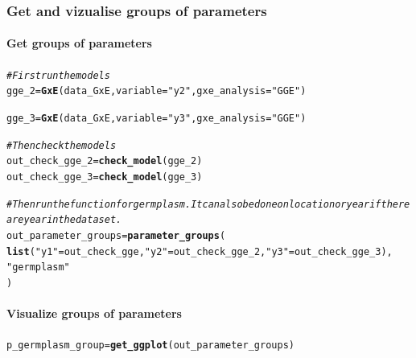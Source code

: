\documentclass{article}\usepackage[]{graphicx}\usepackage[]{color}
\makeatletter
\newcommand{\hlstr}[1]{\textcolor[rgb]{0.192,0.494,0.8}{#1}}%
\newcommand{\hlcom}[1]{\textcolor[rgb]{0.678,0.584,0.686}{\textit{#1}}}%
\newcommand{\hlstd}[1]{\textcolor[rgb]{0.345,0.345,0.345}{#1}}%
\newcommand{\hlkwb}[1]{\textcolor[rgb]{0.69,0.353,0.396}{#1}}%
\newcommand{\hlkwc}[1]{\textcolor[rgb]{0.333,0.667,0.333}{#1}}%
\newcommand{\hlkwd}[1]{\textcolor[rgb]{0.737,0.353,0.396}{\textbf{#1}}}%
\newenvironment{kframe}{%
 \def\at@end@of@kframe{}%
 \ifinner\ifhmode%
  \def\at@end@of@kframe{\end{minipage}}%
  \begin{minipage}{\columnwidth}%
 \fi\fi%
 \def\FrameCommand##1{\hskip\@totalleftmargin \hskip-\fboxsep
 \colorbox{shadecolor}{##1}\hskip-\fboxsep
     \hskip-\linewidth \hskip-\@totalleftmargin \hskip\columnwidth}%
 \MakeFramed {\advance\hsize-\width
   \@totalleftmargin\z@ \linewidth\hsize
   \@setminipage}}%
 {\par\unskip\endMakeFramed%
 \at@end@of@kframe}
\newenvironment{knitrout}{}{} %
\makeatother
\begin{document}
\subsubsection{Get and vizualise groups of parameters}

\paragraph{Get groups of parameters}

\begin{knitrout}
\color{fgcolor}\begin{kframe}
\begin{alltt}
\hlcom{# First run the models}
\hlstd{gge_2} \hlkwb{=} \hlkwd{GxE}\hlstd{(data_GxE,} \hlkwc{variable} \hlstd{=} \hlstr{"y2"}\hlstd{,} \hlkwc{gxe_analysis} \hlstd{=} \hlstr{"GGE"}\hlstd{)}
\end{alltt}


{\ttfamily\noindent\itshape\color{messagecolor}{\#\# GGE model done for y2}}\begin{alltt}
\hlstd{gge_3} \hlkwb{=} \hlkwd{GxE}\hlstd{(data_GxE,} \hlkwc{variable} \hlstd{=} \hlstr{"y3"}\hlstd{,} \hlkwc{gxe_analysis} \hlstd{=} \hlstr{"GGE"}\hlstd{)}
\end{alltt}


{\ttfamily\noindent\itshape\color{messagecolor}{\#\# GGE model done for y3}}\begin{alltt}
\hlcom{# Then check the models}
\hlstd{out_check_gge_2} \hlkwb{=} \hlkwd{check_model}\hlstd{(gge_2)}
\hlstd{out_check_gge_3} \hlkwb{=} \hlkwd{check_model}\hlstd{(gge_3)}

\hlcom{# Then run the function for germplasm. It can also be done on location or year if there are year in the data set.}
\hlstd{out_parameter_groups} \hlkwb{=} \hlkwd{parameter_groups}\hlstd{(}
  \hlkwd{list}\hlstd{(}\hlstr{"y1"} \hlstd{= out_check_gge,} \hlstr{"y2"} \hlstd{= out_check_gge_2,} \hlstr{"y3"} \hlstd{= out_check_gge_3),}
  \hlstr{"germplasm"}
  \hlstd{)}
\end{alltt}
\end{kframe}
\end{knitrout}

\paragraph{Visualize groups of parameters}
\begin{knitrout}
\color{fgcolor}\begin{kframe}
\begin{alltt}
\hlstd{p_germplasm_group} \hlkwb{=} \hlkwd{get_ggplot}\hlstd{(out_parameter_groups)}
\end{alltt}
\end{kframe}
\end{knitrout}
\end{document}
